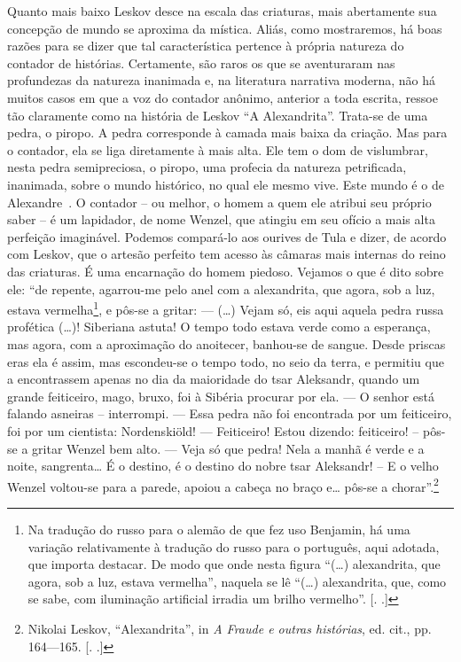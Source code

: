 Quanto mais baixo Leskov desce na escala das criaturas, mais abertamente
sua concepção de mundo se aproxima da mística. Aliás, como mostraremos,
há boas razões para se dizer que tal característica pertence à própria
natureza do contador de histórias. Certamente, são raros os que se
aventuraram nas profundezas da natureza inanimada e, na literatura
narrativa moderna, não há muitos casos em que a voz do contador anônimo,
anterior a toda escrita, ressoe tão claramente como na história de
Leskov ``A Alexandrita''. Trata-se de uma pedra, o piropo. A pedra
corresponde à camada mais baixa da criação. Mas para o contador, ela se
liga diretamente à mais alta. Ele tem o dom de vislumbrar, nesta pedra
semipreciosa, o piropo, uma profecia da natureza petrificada, inanimada,
sobre o mundo histórico, no qual ele mesmo vive. Este mundo é o de
Alexandre~. O contador -- ou melhor, o homem a quem ele atribui seu
próprio saber -- é um lapidador, de nome Wenzel, que atingiu em seu
ofício a mais alta perfeição imaginável. Podemos compará-lo aos ourives
de Tula e dizer, de acordo com Leskov, que o artesão perfeito tem acesso
às câmaras mais internas do reino das criaturas. É uma encarnação do
homem piedoso. Vejamos o que é dito sobre ele: ``de repente, agarrou-me
pelo anel com a alexandrita, que agora, sob a luz, estava
vermelha\footnote{Na tradução do russo para o alemão de que fez uso
  Benjamin, há uma variação relativamente à tradução do russo para o
  português, aqui adotada, que importa destacar. De modo que onde nesta
  figura ``(\ldots{}) alexandrita, que agora, sob a luz, estava
  vermelha'', naquela se lê ``(\ldots{}) alexandrita, que, como se sabe,
  com iluminação artificial irradia um brilho vermelho''. [. .]}, e pôs-se a gritar: --- (\ldots{}) Vejam só, eis aqui aquela pedra
russa profética (\ldots{})! Siberiana astuta! O tempo todo estava verde como
a esperança, mas agora, com a aproximação do anoitecer, banhou-se de
sangue. Desde priscas eras ela é assim, mas escondeu-se o tempo todo, no
seio da terra, e permitiu que a encontrassem apenas no dia da maioridade
do tsar Aleksandr, quando um grande feiticeiro, mago, bruxo, foi à
Sibéria procurar por ela. --- O senhor está falando asneiras --
interrompi. --- Essa pedra não foi encontrada por um feiticeiro, foi por
um cientista: Nordenskiöld! --- Feiticeiro! Estou dizendo: feiticeiro! --
pôs-se a gritar Wenzel bem alto. --- Veja só que pedra! Nela a manhã é
verde e a noite, sangrenta\ldots{} É o destino, é o destino do nobre tsar
Aleksandr! -- E o velho Wenzel voltou-se para a parede, apoiou a cabeça no
braço e\ldots{} pôs-se a chorar''.\footnote{Nikolai Leskov, ``Alexandrita'',
  in \emph{A Fraude e outras histórias}, ed. cit., pp. 164---165. [. .]}

